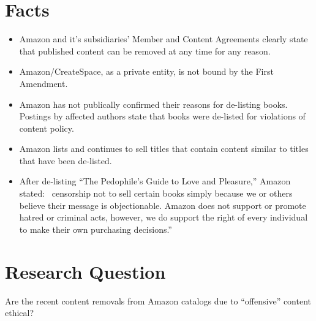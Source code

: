 \documentclass[11pt]{article}
\begin{document}
\newpage

\begin{multicols}{2}
\setcounter{page}{1}
\section{Facts}

\begin{itemize}

\item Amazon and it's subsidiaries' Member and Content Agreements clearly state that published content can be removed at any time for any reason. \cite{CreateSpaceMemberAgreement} \cite{CreateSpaceContentGuidelines} \cite{AmazonKDPContentGuidelines}

\item Amazon/CreateSpace, as a private entity, is not bound by the First Amendment.

\item Amazon has not publically confirmed their reasons for de-listing books. Postings by affected authors state that books were de-listed for violations of content policy. \cite{KittSelfPubRevolution} 

\item Amazon lists and continues to sell titles that contain content similar to titles that have been de-listed. \cite{AmazonLolitaDTPListing}

\item After de-listing ``The Pedophile's Guide to Love and Pleasure,'' Amazon stated: \ censorship not to sell certain books simply because we or others believe their message is objectionable.  Amazon does not support or promote hatred or criminal acts, however, we do support the right of every individual to make their own purchasing decisions.'' \cite{TechCrunchAmazonCensorship}

\end{itemize}

\section{Research Question}
Are the recent content removals from Amazon catalogs due to ``offensive'' content ethical?



\end{multicols}
\end{document}

